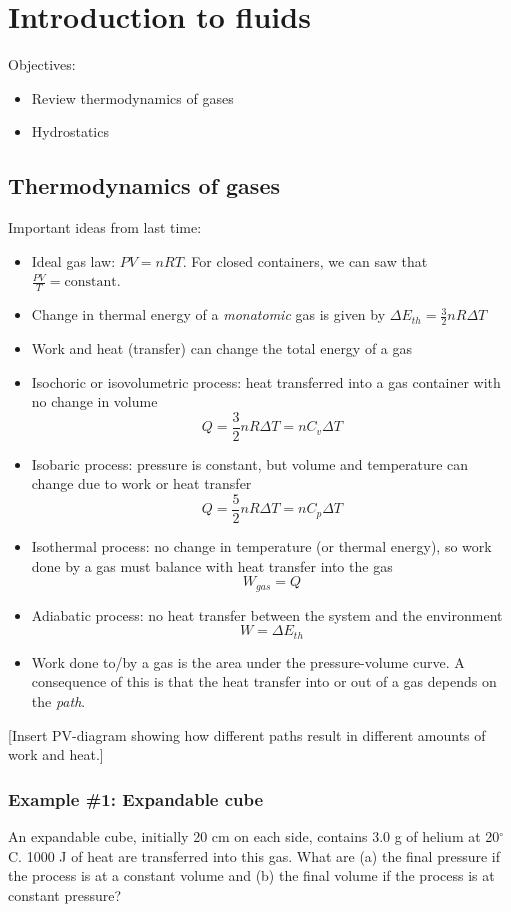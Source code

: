 \section{Introduction to fluids}
Objectives:
\begin{itemize}
\item Review thermodynamics of gases
\item Hydrostatics
\end{itemize}

\hrulefill

\subsection{Thermodynamics of gases}
Important ideas from last time:
\begin{itemize}
\item Ideal gas law: $PV=nRT$. For closed containers, we can saw that $\frac{PV}{T}=\mbox{constant}$.
\item Change in thermal energy of a \textit{monatomic} gas is given by $\Delta{E_{th}}=\frac{3}{2}nR\Delta{T}$
\item Work and heat (transfer) can change the total energy of a gas
\item Isochoric or isovolumetric process: heat transferred into a gas container with no change in volume
  $$Q=\frac{3}{2}nR\Delta{T}=nC_v\Delta{T}$$
\item Isobaric process: pressure is constant, but volume and temperature can change due to work or heat transfer
  $$Q=\frac{5}{2}nR\Delta{T}=nC_p\Delta{T}$$
\item Isothermal process: no change in temperature (or thermal energy), so work done by a gas must balance with heat transfer into the gas
  $$W_{gas}=Q$$
\item Adiabatic process: no heat transfer between the system and the environment
  $$W=\Delta{E_{th}}$$
\item Work done to/by a gas is the area under the pressure-volume curve. A consequence of this is that the heat transfer into or out of a gas depends on the \textit{path}.  
\end{itemize}

[Insert PV-diagram showing how different paths result in different amounts of work and heat.]
\vspace{6cm}

\subsubsection{Example \#1: Expandable cube}
An expandable cube, initially 20 cm on each side, contains 3.0 g of helium at 20$^\circ$C. 1000 J of heat are transferred into this gas. What are (a) the final pressure if the process is at a constant volume and (b) the final volume if the process is at constant pressure?

